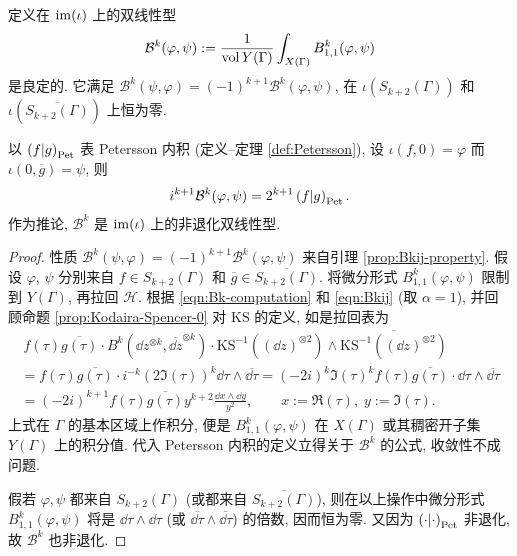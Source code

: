 \begin{theorem}\label{prop:Eichler-Shimura-polarization}
	定义在 $\operatorname{im}(\iota)$ 上的双线性型
	\[ \mathcal{B}^k(\varphi, \psi) := \frac{1}{\operatorname{vol} Y(\Gamma)} \int_{X(\Gamma)} B^k_{1,1}(\varphi, \psi) \]
	是良定的. 它满足 $\mathcal{B}^k(\psi, \varphi) = (-1)^{k+1} \mathcal{B}^k(\varphi, \psi)$, 在 $\iota(S_{k+2}(\Gamma))$ 和 $\iota(\overline{S_{k+2}(\Gamma)})$ 上恒为零.
	
	以 $\left( f \middle| g \right)_{\mathrm{Pet}}$ 表 Petersson 内积 (定义--定理 \ref{def:Petersson}), 设 $\iota(f, 0) = \varphi$ 而 $\iota(0, \overline{g}) = \psi$, 则
	\begin{gather*}
		i^{k+1} \mathcal{B}^k(\varphi, \psi) = 2^{k+1} \left( f \middle| g \right)_{\mathrm{Pet}}.
	\end{gather*}
	作为推论, $\mathcal{B}^k$ 是 $\operatorname{im}(\iota)$ 上的非退化双线性型.
\end{theorem}
\begin{proof}
	性质 $\mathcal{B}^k(\psi, \varphi) = (-1)^{k+1} \mathcal{B}^k(\varphi, \psi)$ 来自引理 \ref{prop:Bkij-property}. 假设 $\varphi$, $\psi$ 分别来自 $f \in S_{k+2}(\Gamma)$ 和 $\overline{g} \in \overline{S_{k+2}(\Gamma)}$. 将微分形式 $B^k_{1,1}(\varphi, \psi)$ 限制到 $Y(\Gamma)$, 再拉回 $\mathcal{H}$. 根据 \eqref{eqn:Bk-computation} 和 \eqref{eqn:Bkij} (取 $\alpha = 1$), 并回顾命题 \ref{prop:Kodaira-Spencer-0} 对 $\mathrm{KS}$ 的定义, 如是拉回表为
	\begin{multline*}\
		f(\tau) \overline{g(\tau)} \cdot B^k \left(\dd z^{\otimes k}, \overline{\dd z}^{\otimes k}\right) \cdot \mathrm{KS}^{-1}\left((\dd z)^{\otimes 2}\right) \wedge \overline{\mathrm{KS}^{-1} \left((\dd z)^{\otimes 2}\right)} \\
		= f(\tau) \overline{g(\tau)} \cdot i^{-k} (2\Im(\tau))^k \dd \tau \wedge \overline{\dd \tau} = (-2i)^k \Im(\tau)^k f(\tau) \overline{g(\tau)} \cdot \dd \tau \wedge \overline{\dd \tau} \\
		= (-2i)^{k+1} f(\tau) \overline{g(\tau)} y^{k+2} \frac{\dd x \wedge \dd y}{y^2}, \qquad x := \Re(\tau), \; y := \Im(\tau).
	\end{multline*}
	上式在 $\Gamma$ 的基本区域上作积分, 便是 $B^k_{1,1}(\varphi, \psi)$ 在 $X(\Gamma)$ 或其稠密开子集 $Y(\Gamma)$ 上的积分值. 代入 Petersson 内积的定义立得关于 $\mathcal{B}^k$ 的公式, 收敛性不成问题.
	
	假若 $\varphi, \psi$ 都来自 $S_{k+2}(\Gamma)$ (或都来自 $\overline{S_{k+2}(\Gamma)}$), 则在以上操作中微分形式 $B^k_{1,1}(\varphi, \psi)$ 将是 $\dd\tau \wedge \dd\tau$ (或 $\overline{\dd\tau} \wedge \overline{\dd \tau}$) 的倍数, 因而恒为零. 又因为 $\left( \cdot \middle| \cdot \right)_{\mathrm{Pet}}$ 非退化, 故 $\mathcal{B}^k$ 也非退化.
\end{proof}

